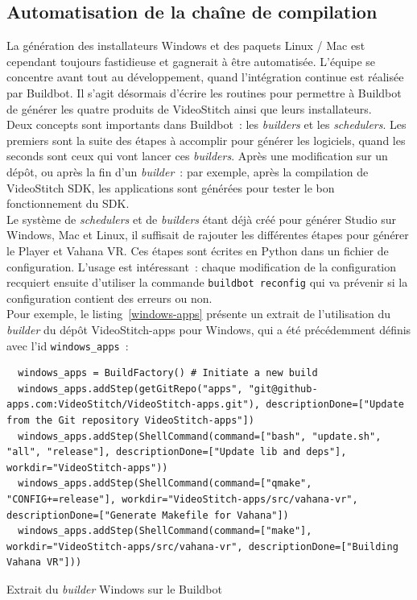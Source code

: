 \subsection{Automatisation de la chaîne de compilation}
La génération des installateurs Windows et des paquets Linux / Mac est cependant
toujours fastidieuse et gagnerait à être automatisée. L'équipe se concentre avant
tout au développement, quand l'intégration continue est réalisée par Buildbot. 
Il s'agit désormais d'écrire les routines pour permettre à Buildbot de générer
les quatre produits de VideoStitch ainsi que leurs installateurs.\\
Deux concepts sont importants dans Buildbot~: les \textit{builders} et les \textit{schedulers}.
Les premiers sont la suite des étapes à accomplir pour générer les logiciels, quand
les seconds sont ceux qui vont lancer ces \textit{builders}. Après une modification
sur un dépôt, ou après la fin d'un \textit{builder}~: par exemple, après la compilation de
VideoStitch SDK, les applications sont générées pour tester le bon fonctionnement
du SDK.\\
Le système de \textit{schedulers} et de \textit{builders} étant déjà créé pour 
générer Studio sur Windows, Mac et Linux, il suffisait de rajouter les différentes 
étapes pour générer le Player et Vahana VR. Ces étapes sont écrites en Python dans un fichier de configuration.
L'usage est intéressant~: chaque modification de la configuration recquiert ensuite d'utiliser la commande
\texttt{buildbot reconfig} qui va prévenir si la configuration
contient des erreurs ou non.\\
\newline
Pour exemple, le listing~\ref{windows-apps} présente un extrait de l'utilisation 
du \textit{builder} du dépôt VideoStitch-apps pour Windows, qui a été précédemment 
définis avec l'id \texttt{windows_apps}~:
\begin{listing}
  \begin{verbatim}
  windows_apps = BuildFactory() # Initiate a new build
  windows_apps.addStep(getGitRepo("apps", "git@github-apps.com:VideoStitch/VideoStitch-apps.git"), descriptionDone=["Update from the Git repository VideoStitch-apps"])
  windows_apps.addStep(ShellCommand(command=["bash", "update.sh", "all", "release"], descriptionDone=["Update lib and deps"], workdir="VideoStitch-apps"))
  windows_apps.addStep(ShellCommand(command=["qmake", "CONFIG+=release"], workdir="VideoStitch-apps/src/vahana-vr", descriptionDone=["Generate Makefile for Vahana"])
  windows_apps.addStep(ShellCommand(command=["make"], workdir="VideoStitch-apps/src/vahana-vr", descriptionDone=["Building Vahana VR"]))
  \end{verbatim}
  \caption{Extrait du \textit{builder} Windows sur le Buildbot}
  \label{windows-apps}
\end{listing}

